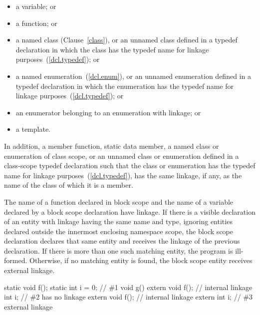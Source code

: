 \begin{itemize}
\item a variable; or

\item a function; or

\item {}%
a named class (Clause~\ref{class}), or an unnamed class defined in a
typedef declaration in which the class has the typedef name for linkage
purposes~(\ref{dcl.typedef}); or

\item {}%
a named enumeration~(\ref{dcl.enum}), or an unnamed enumeration defined
in a typedef declaration in which the enumeration has the typedef name
for linkage purposes~(\ref{dcl.typedef}); or

\item an enumerator belonging to an enumeration with linkage; or

\item a template.
\end{itemize}

\pnum
In addition, a member function, static data member, a named class or
enumeration of class scope, or an unnamed class or enumeration defined
in a class-scope typedef declaration such that the class or enumeration
has the typedef name for linkage purposes~(\ref{dcl.typedef}), has
the same linkage, if any, as the name of the class of which it is a
member.

\pnum
The name of a function declared in block scope and the name of a variable declared by a
block scope  declaration have linkage. If there is a visible declaration
of an entity with linkage having the same name and type, ignoring entities declared
outside the innermost enclosing namespace scope, the block scope declaration declares
that same entity and receives the linkage of the previous declaration. If there is more
than one such matching entity, the program is ill-formed. Otherwise, if no matching
entity is found, the block scope entity receives external linkage.\enterexample

\begin{codeblock}
static void f();
static int i = 0;               // \#1
void g() {
  extern void f();              // internal linkage
  int i;                        // \#2  has no linkage
  {
    extern void f();            // internal linkage
    extern int i;               // \#3 external linkage
  }
}
\end{codeblock}

